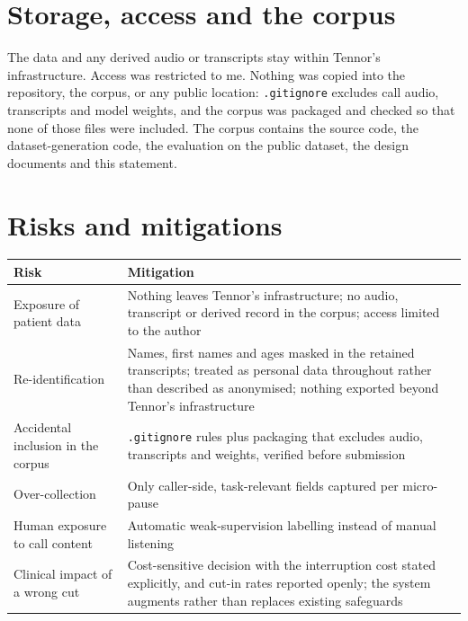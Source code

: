 \section{Storage, access and the corpus}

The data and any derived audio or transcripts stay within Tennor's infrastructure. Access
was restricted to me. Nothing was copied into the repository, the corpus, or any public
location: \texttt{.gitignore} excludes call audio, transcripts and model weights, and the
corpus was packaged and checked so that none of those files were included. The corpus
contains the source code, the dataset-generation code, the evaluation on the public dataset,
the design documents and this statement.

\section{Risks and mitigations}

\begin{table}[H]
\centering
\small
\begin{tabular}{@{}p{5.5cm}p{8.0cm}@{}}
\toprule
Risk & Mitigation \\
\midrule
Exposure of patient data & Nothing leaves Tennor's infrastructure; no audio, transcript or
derived record in the corpus; access limited to the author \\
Re-identification & Names, first names and ages masked in the retained transcripts; treated as personal data throughout rather than described as anonymised; nothing exported beyond Tennor's infrastructure \\
Accidental inclusion in the corpus & \texttt{.gitignore} rules plus packaging that excludes
audio, transcripts and weights, verified before submission \\
Over-collection & Only caller-side, task-relevant fields captured per micro-pause \\
Human exposure to call content & Automatic weak-supervision labelling instead of manual
listening \\
Clinical impact of a wrong cut & Cost-sensitive decision with the interruption cost stated
explicitly, and cut-in rates reported openly; the system augments rather than replaces
existing safeguards \\
\bottomrule
\end{tabular}
\end{table}
